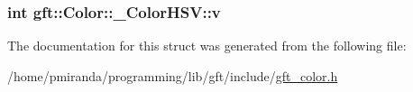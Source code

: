\subsubsection[{\texorpdfstring{v}{v}}]{\setlength{\rightskip}{0pt plus 5cm}int gft\+::\+Color\+::\+\_\+\+Color\+H\+S\+V\+::v}\hypertarget{structgft_1_1Color_1_1__ColorHSV_a4030c27b07fa59ce2f6a9c88c83721c6}{}\label{structgft_1_1Color_1_1__ColorHSV_a4030c27b07fa59ce2f6a9c88c83721c6}


The documentation for this struct was generated from the following file\+:\begin{DoxyCompactItemize}
\item 
/home/pmiranda/programming/lib/gft/include/\hyperlink{gft__color_8h}{gft\+\_\+color.\+h}\end{DoxyCompactItemize}
